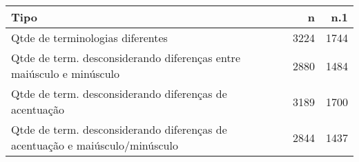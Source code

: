 \begin{table}[ht]
\centering
\begin{tabular}{lrr}
  \hline
Tipo & n & n.1 \\ 
  \hline
Qtde de terminologias diferentes & 3224 & 1744 \\ 
  Qtde de term. desconsiderando diferenças entre maiúsculo e minúsculo & 2880 & 1484 \\ 
  Qtde de term. desconsiderando diferenças de acentuação & 3189 & 1700 \\ 
  Qtde de term. desconsiderando diferenças de acentuação e
          maiúsculo/minúsculo & 2844 & 1437 \\ 
   \hline
\end{tabular}
\end{table}
